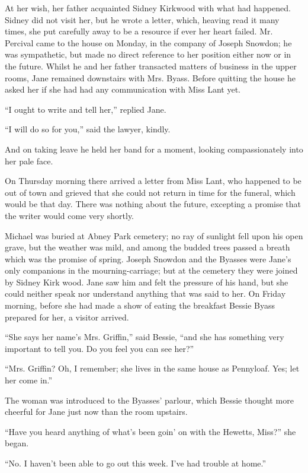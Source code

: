 At her wish, her father acquainted Sidney Kirkwood with what had
happened. Sidney did not visit her, but he wrote a letter, which,
{\protect\hypertarget{219}{}{}}heaving read it many times, she put
carefully away to be a resource if ever her heart failed. Mr. Percival
came to the house on Monday, in the company of Joseph Snowdon; he was
sympathetic, but made no direct reference to her position either now or
in the future. Whilst he and her father transacted matters of business
in the upper rooms, Jane remained downstairs with Mrs. Byass. Before
quitting the house he asked her if she had had any communication with
Miss Lant yet.

``I ought to write and tell her,'' replied Jane.

``I will do so for you,'' said the lawyer, kindly.

And on taking leave he held her band for a moment, looking
compassionately into her pale face.

On Thursday morning there arrived a letter from Miss Lant, who happened
to be out of town and grieved that she could not return in time for the
funeral, which would be that day. There was nothing about the future,
excepting a promise that the writer would come very shortly.

Michael was buried at Abney Park
{\protect\hypertarget{220}{}{}}cemetery; no ray of sunlight fell upon
his open grave, but the weather was mild, and among the budded trees
passed a breath which was the promise of spring. Joseph Snowdon and the
Byasses were Jane's only companions in the mourning-carriage; but at the
cemetery they were joined by Sidney Kirk wood. Jane saw him and felt the
pressure of his hand, but she could neither speak nor understand
anything that was said to her. On Friday morning, before she had made a
show of eating the breakfast Bessie Byass prepared for her, a visitor
arrived.

``She says her name's Mrs. Griffin,'' said Bessie, ``and she has
something very important to tell you. Do you feel you can see her?''

``Mrs. Griffin? Oh, I remember; she lives in the same house as
Pennyloaf. Yes; let her come in.''

The woman was introduced to the Byasses' parlour, which Bessie thought
more cheerful for Jane just now than the room upstairs.

``Have you heard anything of what's been goin' on with the Hewetts,
Miss?'' she began.

``No. I haven't been able to go out this week. I've had trouble at
home.''

